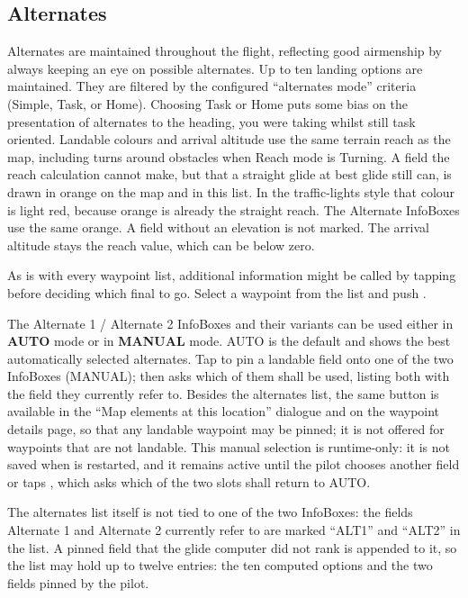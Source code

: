 \subsection*{Alternates}\label{sec:alternates}
Alternates are maintained throughout the flight, reflecting good airmenship by
always keeping an eye on possible alternates. Up to ten landing
options are maintained. They are filtered by the configured ``alternates mode''
criteria (Simple, Task, or Home). 
Choosing Task or Home puts some bias on the presentation of alternates to the
heading, you were taking whilst still task oriented.
Landable colours and arrival altitude use the same terrain reach as the
map, including turns around obstacles when Reach mode is Turning.
A field the reach calculation cannot make, but that a straight glide at
best glide still can, is drawn in orange on the map and in this list.
In the traffic-lights style that colour is light red, because orange is
already the straight reach. The Alternate InfoBoxes use the same orange.
A field without an elevation is not marked. The arrival altitude stays
the reach value, which can be below zero.

As is with every waypoint list, additional information might be called by tapping  before deciding which final to go. Select a waypoint from the list and push .

The Alternate 1 / Alternate 2 InfoBoxes and their variants can be used either
in \textbf{AUTO} mode or in \textbf{MANUAL} mode. AUTO is the default and
shows the best automatically selected alternates. Tap  to pin a landable field onto one of the two InfoBoxes (MANUAL);
\xc{} then asks which of them shall be used, listing both with the field they
currently refer to. Besides the alternates list, the same button is available
in the ``Map elements at this location'' dialogue and on the waypoint details
page, so that any landable waypoint may be pinned; it is not offered for
waypoints that are not landable. This manual selection is runtime-only: it is
not saved when \xc{} is restarted, and it remains active until the pilot
chooses another field or taps , which asks which
of the two slots shall return to AUTO.

The alternates list itself is not tied to one of the two InfoBoxes: the fields
Alternate 1 and Alternate 2 currently refer to are marked ``ALT1'' and
``ALT2'' in the list. A pinned field that the glide computer did not rank is
appended to it, so the list may hold up to twelve entries: the ten computed
options and the two fields pinned by the pilot.

